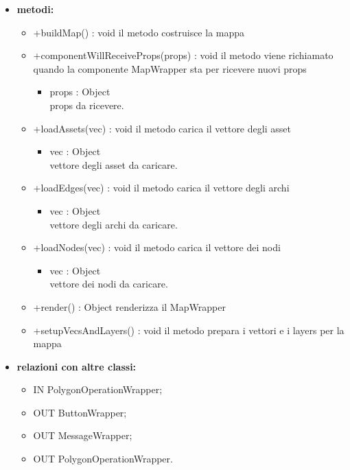 \begin{itemize}
	\item \textbf{metodi:}
	\begin{itemize}
		\item +buildMap() : void\newline
		il metodo costruisce la mappa
		\item +componentWillReceiveProps(props) : void\newline
		il metodo viene richiamato quando la componente MapWrapper sta per ricevere nuovi props
		\begin{itemize}
			\item props : Object\\
			props da ricevere.
		\end{itemize}
		\item +loadAssets(vec) : void\newline
		il metodo carica il vettore degli asset
		\begin{itemize}
			\item vec : Object\\
			vettore degli asset da caricare.
		\end{itemize}
		\item +loadEdges(vec) : void\newline
		il metodo carica il vettore degli archi
		\begin{itemize}
			\item vec : Object\\
			vettore degli archi da caricare.
		\end{itemize}
		\item +loadNodes(vec) : void\newline
		il metodo carica il vettore dei nodi
		\begin{itemize}
			\item vec : Object\\
			vettore dei nodi da caricare.
		\end{itemize}
		\item +render() : Object\newline
		renderizza il MapWrapper
		\item +setupVecsAndLayers() : void\newline
		il metodo prepara i vettori e i layers per la mappa
	\end{itemize}
	\item \textbf{relazioni con altre classi:} 
	\begin{itemize}
		\item IN PolygonOperationWrapper;
		\item OUT ButtonWrapper;
		\item OUT MessageWrapper;
		\item OUT PolygonOperationWrapper.
	\end{itemize}
\end{itemize}
